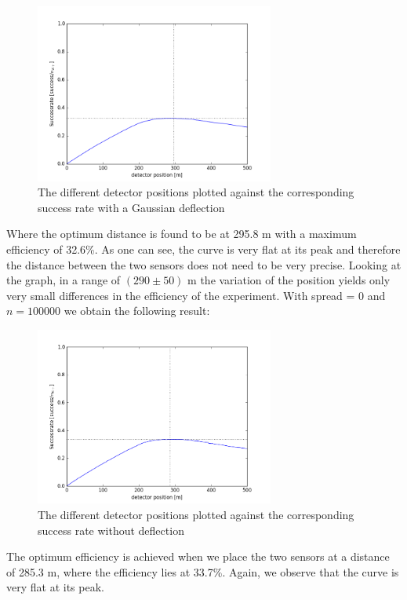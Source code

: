 \documentclass[a4paper,parskip,11pt, DIV12]{scrreprt}
\begin{document}
	\begin{figure}[H] 
		\centering
		\includegraphics[width=0.7\textwidth]{Simulation100kWithSpread.png} 
		\caption{The different detector positions plotted against the corresponding success rate with a Gaussian deflection}   
	\end{figure}
	
	Where the optimum distance is found to be at 295.8 m with a maximum efficiency of 32.6\%. As one can see, the curve is very flat at its peak and therefore the distance between the two sensors does not need to be very precise. Looking at the graph, in a range of $(290 \pm 50)$ m the variation of the position yields only very small differences in the efficiency of the experiment.
	\clearpage
	With spread = 0 and $n = 100000$ we obtain the following result:
	
	\begin{figure}[H] 
		\centering
		\includegraphics[width=0.7\textwidth]{Simulation100kNoSpread.png} 
		\caption{The different detector positions plotted against the corresponding success rate without deflection}   
	\end{figure}
	
	The optimum efficiency is achieved when we place the two sensors at a distance of 285.3 m, where the efficiency lies at 33.7\%. Again, we observe that the curve is very flat at its peak. 
	
\end{document}
